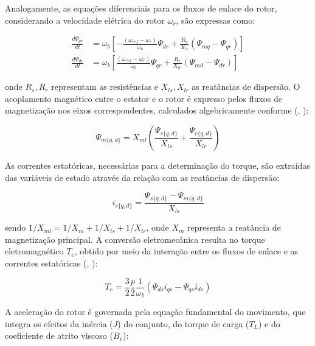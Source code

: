 \documentclass[a4paper]{ifacconf}
\begin{document}
Analogamente, as equações diferenciais para os fluxos de enlace do rotor, considerando a velocidade elétrica do rotor $\omega_r$, são expressas como:

\begin{align}
\frac{d\Psi_{qr}}{dt} &= \omega_b \left[-\frac{(\omega_{ref} - \omega_r)}{\omega_b}\Psi_{dr} + \frac{R_r}{X_{lr}}(\Psi_{mq} - \Psi_{qr})\right] \label{eq:dPsiqr} \\[4pt]
\frac{d\Psi_{dr}}{dt} &= \omega_b \left[\frac{(\omega_{ref} - \omega_r)}{\omega_b}\Psi_{qr} + \frac{R_r}{X_{lr}}(\Psi_{md} - \Psi_{dr})\right] \label{eq:dPsidr}
\end{align}

onde $R_s, R_r$ representam as resistências e $X_{ls}, X_{lr}$ as reatâncias de dispersão. O acoplamento magnético entre o estator e o rotor é expresso pelos fluxos de magnetização nos eixos correspondentes, calculados algebricamente conforme (\citeauthor{aktaibi2011dynamic}, \citeyear{aktaibi2011dynamic}):

\begin{equation}
    \Psi_{m\{q,d\}} = X_{ml} \left( \frac{\Psi_{s\{q,d\}}}{X_{ls}} + \frac{\Psi_{r\{q,d\}}}{X_{lr}} \right)
    \label{eq:psim}
\end{equation}

As correntes estatóricas, necessárias para a determinação do torque, são extraídas das variáveis de estado através da relação com as reatâncias de dispersão:

\begin{equation}
    i_{s\{q,d\}} = \frac{\Psi_{s\{q,d\}} - \Psi_{m\{q,d\}}}{X_{ls}}
    \label{eq:is}
\end{equation}

sendo $1/X_{ml} = 1/X_m + 1/X_{ls} + 1/X_{lr}$, onde $X_m$ representa a reatância de magnetização principal. A conversão eletromecânica resulta no torque eletromagnético $T_e$, obtido por meio da interação entre os fluxos de enlace e as correntes estatóricas (\citeauthor{diaz2009induction}, \citeyear{diaz2009induction}):

\begin{equation}
    T_e = \frac{3}{2} \frac{p}{2} \frac{1}{\omega_b} (\Psi_{ds} i_{qs} - \Psi_{qs} i_{ds})
    \label{eq:te}
\end{equation}

A aceleração do rotor é governada pela equação fundamental do movimento, que integra os efeitos da inércia ($J$) do conjunto, do torque de carga ($T_L$) e do coeficiente de atrito viscoso ($B_v$):
\end{document}
